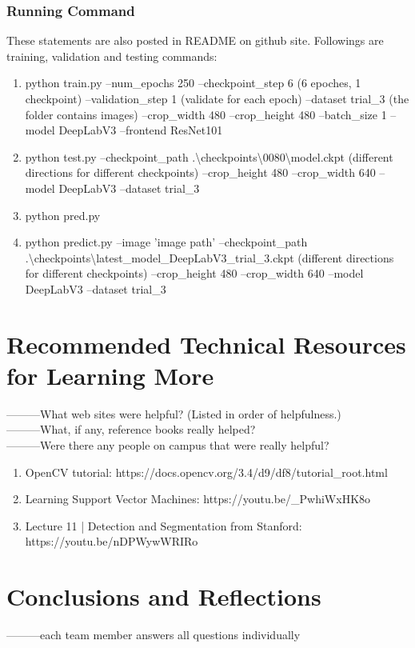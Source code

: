 \documentclass[10pt,journal,compsoc, draftclsnofoot,onecolumn]{IEEEtran}
\begin{document}
\subsubsection{Running Command}
These statements are also posted in README on github site. Followings are training, validation and testing commands:
\begin{enumerate}
\item python train.py --num\_epochs 250 --checkpoint\_step 6 (6 epoches, 1 checkpoint) --validation\_step 1 (validate for each epoch) --dataset trial\_3 (the folder contains images) --crop\_width 480 --crop\_height 480 --batch\_size 1 --model DeepLabV3 --frontend ResNet101
\item python test.py --checkpoint\_path .\textbackslash checkpoints\textbackslash0080\textbackslash model.ckpt (different directions for different checkpoints) --crop\_height 480 --crop\_width 640 --model DeepLabV3 --dataset trial\_3
\item python pred.py 
\item python predict.py --image 'image path' --checkpoint\_path .\textbackslash checkpoints\textbackslash latest\_model\_DeepLabV3\_trial\_3.ckpt (different directions for different checkpoints) --crop\_height 480 --crop\_width 640 --model DeepLabV3 --dataset trial\_3 
\end{enumerate}


\newpage
\section{Recommended Technical Resources for Learning More}
---------What web sites were helpful? (Listed in order of helpfulness.) \\
---------What, if any, reference books really helped? \\
---------Were there any people on campus that were really helpful?

\begin{enumerate}
\item OpenCV tutorial: https://docs.opencv.org/3.4/d9/df8/tutorial\_root.html 
\item Learning Support Vector Machines: https://youtu.be/\_PwhiWxHK8o
\item Lecture 11 | Detection and Segmentation from Stanford: https://youtu.be/nDPWywWRIRo
\end{enumerate}


\section{Conclusions and Reflections}
---------each team member answers all questions individually
\end{document}
